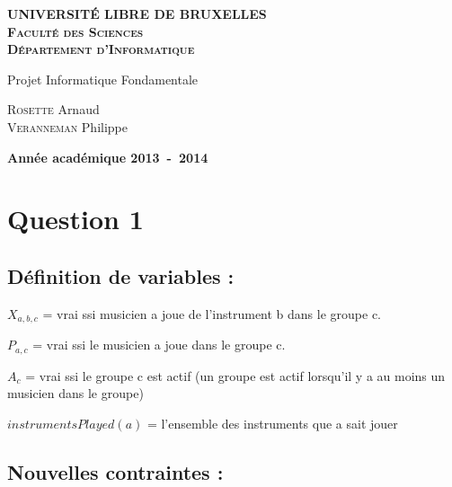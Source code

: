 \documentclass[a4paper,10pt]{article}
\begin{document}
\begin{titlepage}
    \begin{center}
        \textbf{\textsc{UNIVERSIT\'E LIBRE DE BRUXELLES}}\\
        \textbf{\textsc{Faculté des Sciences}}\\
        \textbf{\textsc{Département d'Informatique}}

        \vfill{}\vfill{}

        \begin{center}
            \Huge{Projet Informatique Fondamentale}
        \end{center}
        \Huge{\par}
        \begin{center}
            \large{
                \textsc{Rosette} Arnaud \\
                \textsc{Veranneman} Philippe
            }
        \end{center}
        \Huge{\par}

        \vfill{}\vfill{}

        \vfill{}\vfill{}\enlargethispage{3cm}

        \textbf{Année académique 2013~-~2014}
    \end{center}
\end{titlepage}


\tableofcontents
\pagebreak


\section{Question 1}

\subsection{Définition de variables : }

$X_{a,b,c}$ = vrai ssi musicien a joue de l'instrument b dans le groupe c.

$P_{a,c}$ = vrai ssi le musicien a joue dans le groupe c.

$A_c$ = vrai ssi le groupe c est actif (un groupe est actif lorsqu'il y a au moins un musicien dans le groupe)

$instrumentsPlayed(a)$ = l'ensemble des instruments que a sait jouer

\subsection{Nouvelles contraintes : }
\end{document}
